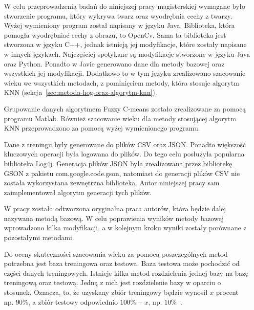 \documentclass[a4paper,twoside,12pt]{book}
\begin{document}
    W celu przeprowadzenia badań do niniejszej pracy magisterskiej wymagane było stworzenie programu,
    który wykrywa twarz oraz wyodrębnia cechy z twarzy. Wyżej wymieniony program został napisany w języku Java.
    Biblioteka, która pomogła wyodrębniać cechy z obrazu, to OpenCv. Sama ta biblioteka jest stworzona w języku C++, jednak
    istnieją jej modyfikacje, które zostały napisane w innych językach. Najczęściej spotykane są modyfikacje
    stworzone w języku Java oraz Python. Ponadto w Javie generowano dane dla metody bazowej oraz wszystkich
    jej modyfikacji. Dodatkowo to w tym języku zrealizowano szacowanie wieku we wszystkich metodach, z
    pominięciem metody, która stosuje algorytm KNN (sekcja~\ref{sec:metoda-hog-oraz-algorytm-knn}).

    Grupowanie danych algorytmem Fuzzy C-means zostało zrealizowane za pomocą programu Matlab.
    Również szacowanie wieku dla metody stosującej algorytm KNN przeprowadzono za pomocą wyżej wymienionego
    programu.

    Dane z treningu były generowane do plików CSV oraz JSON. Ponadto większość kluczowych operacji była logowana do plików. Do
    tego celu posłużyła popularna biblioteka Log4j.
    Generacja plików JSON była zrealizowana przez bibliotekę GSON z pakietu com.google.code.gson, natomiast
    do generacji plików CSV nie została wykorzystana zewnętrzna biblioteka. Autor niniejszej pracy sam zaimplementował
    algorytm generacji tych plików.

    W pracy została odtworzona oryginalna praca autorów, która
    będzie dalej nazywana metodą bazową.
    W celu poprawienia wyników metody bazowej wprowadzono kilka modyfikacji, a
    w kolejnym kroku wyniki zostały porównane z pozostałymi metodami.

    Do oceny skuteczności szacowania wieku za pomocą poszczególnych metod potrzebna jest baza treningowa oraz testowa.
    Baza testowa może pochodzić od części danych treningowych. Istnieje kilka metod rozdzielenia jednej bazy na bazę
    treningową oraz testową.
    Jedną z nich jest rozdzielenie bazy w oparciu o stosunek. Oznacza, to, że uzyskany zbiór treningowy będzie wynosił
    $x$ procent np. 90\%, a zbiór testowy odpowiednio $100\% -x$, np. 10\%~\cite{dataMiningAlgorithms}.
\end{document}
